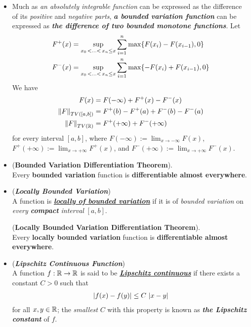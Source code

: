 \documentclass[11pt]{article}
\begin{document}
\begin{itemize}
\item \begin{remark}
Much as \emph{an absolutely integrable function} can be expressed as the difference of its \emph{positive} and \emph{negative parts}, \emph{\textbf{a bounded variation function}} can be expressed as \emph{\textbf{the difference of two bounded monotone functions}}. Let
\begin{align*}
F^{+}(x) &=  \sup\limits_{x_0 \,{<}\ldots{<}\, x_n \le x}\sum_{i=1}^{n}\max\{F(x_i) - F (x_{i-1}), 0\}\\
F^{-}(x) &=  \sup\limits_{x_0 \,{<}\ldots{<}\, x_n \le x}\sum_{i=1}^{n}\max\{-F(x_i) + F (x_{i-1}), 0\}
\end{align*}
We have 
\begin{align*}
F(x) &= F(-\infty) + F^{+}(x) - F^{-}(x)\\
\left\|F\right\|_{TV([a, b])}  &= F^{+}(b) - F^{+}(a) + F^{-}(b) - F^{-}(a)\\
\left\|F\right\|_{TV({\mathbb R})}  &= F^{+}(+\infty) + F^{-}(+\infty) 
\end{align*} for every interval $[a, b]$, where $F(-\infty) := \lim_{x\rightarrow-\infty} F(x)$, $F^{+}(+\infty) := \lim_{x\rightarrow+\infty} F^{+}(x)$, and $F^{-}(+\infty) := \lim_{x\rightarrow+\infty} F^{-}(x)$. 
\end{remark}

\item \begin{corollary} (\textbf{Bounded Variation Differentiation Theorem}). \\
Every \textbf{bounded variation} function is \textbf{differentiable almost everywhere}.
\end{corollary}


\item \begin{definition} (\emph{\textbf{Locally Bounded Variation}})\\
A function is \underline{\emph{\textbf{locally of bounded variation}}} if it is of \emph{bounded variation} on \emph{every \textbf{compact} interval} $[a, b]$. 
\end{definition}

\begin{corollary} (\textbf{Locally Bounded Variation Differentiation Theorem}). \\
Every \textbf{locally bounded variation} function is \textbf{differentiable almost everywhere}.
\end{corollary}

\item \begin{definition} (\emph{\textbf{Lipschitz Continuous Function}})\\
A function $f : {\mathbb R} \rightarrow {\mathbb R}$ is said to be \underline{\emph{\textbf{Lipschitz continuous}}} if there exists a constant $C > 0$ such that
\begin{align*}
\left\lvert f(x) - f(y) \right\rvert \le C\,\left\lvert x - y \right\rvert 
\end{align*} for all $x, y \in {\mathbb R}$; the \emph{smallest} $C$ with this property is known as \emph{\textbf{the Lipschitz constant}} of $f$.
\end{definition}


\end{itemize}
\end{document}
